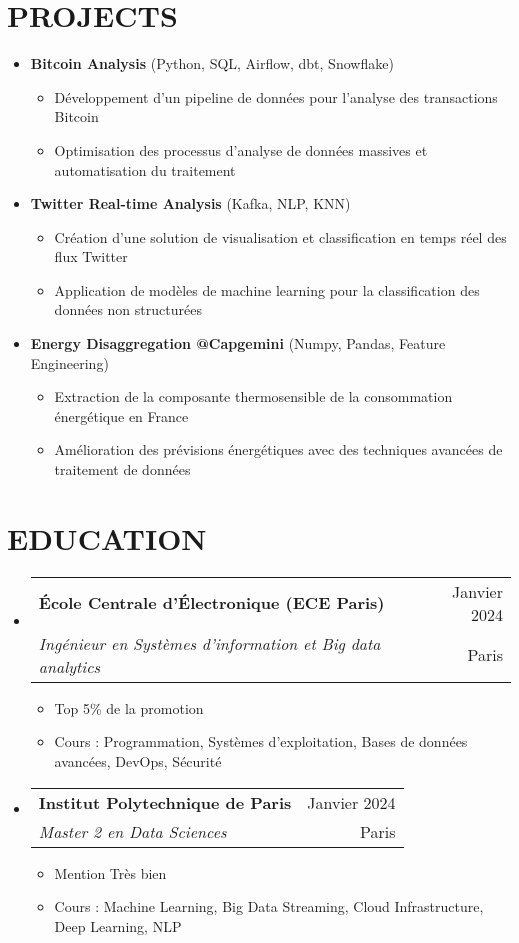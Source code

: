 \documentclass[letterpaper,11pt]{article}
\makeatletter
\newcommand{\resumeItem}[1]{
  \item\small{
    {#1 \vspace{-1pt}}
  }
}
\newcommand{\resumeSubheading}[4]{
  \vspace{-1pt}\item
    \begin{tabular*}{\textwidth}[t]{l@{\extracolsep{\fill}}r}
      \textbf{#1} & {\color{dark-grey}\small #2}\vspace{1pt}\\
      \textit{#3} & {\color{dark-grey} \small #4}\\
    \end{tabular*}\vspace{-4pt}
}
\newcommand{\resumeProjectHeading}[2]{
  \item
  {#1} \hfill {#2}
}
\newcommand{\resumeSubHeadingListStart}{\begin{itemize}[leftmargin=0in, label={}]}
\newcommand{\resumeSubHeadingListEnd}{\end{itemize}}
\newcommand{\resumeItemListStart}{\begin{itemize}[label={\textbullet}]}
\newcommand{\resumeItemListEnd}{\end{itemize}\vspace{0pt}}
\makeatother
\begin{document}
\section{PROJECTS}
\resumeSubHeadingListStart
      \resumeProjectHeading
          {\textbf{Bitcoin Analysis} \small{(Python, SQL, Airflow, dbt, Snowflake)}} {}
          \resumeItemListStart
            \resumeItem{Développement d'un pipeline de données pour l'analyse des transactions Bitcoin}
            \resumeItem{Optimisation des processus d'analyse de données massives et automatisation du traitement}
          \resumeItemListEnd
      \resumeProjectHeading
          {\textbf{Twitter Real-time Analysis} \small{(Kafka, NLP, KNN)}} {}
          \resumeItemListStart
            \resumeItem{Création d'une solution de visualisation et classification en temps réel des flux Twitter}
            \resumeItem{Application de modèles de machine learning pour la classification des données non structurées}
          \resumeItemListEnd
      \resumeProjectHeading
          {\textbf{Energy Disaggregation @Capgemini} \small{(Numpy, Pandas, Feature Engineering)}} {}
          \resumeItemListStart
            \resumeItem{Extraction de la composante thermosensible de la consommation énergétique en France}
            \resumeItem{Amélioration des prévisions énergétiques avec des techniques avancées de traitement de données}
          \resumeItemListEnd
    \resumeSubHeadingListEnd

\section{EDUCATION}
\resumeSubHeadingListStart
    \resumeSubheading
      {École Centrale d'Électronique (ECE Paris)}{Janvier 2024}
      {Ingénieur en Systèmes d'information et Big data analytics}{Paris}
      \resumeItemListStart
        \resumeItem{Top 5\% de la promotion}
        \resumeItem{Cours : Programmation, Syst\`emes d'exploitation, Bases de donn\'ees avanc\'ees, DevOps, S\'ecurit\'e}
      \resumeItemListEnd
    \resumeSubheading
      {Institut Polytechnique de Paris}{Janvier 2024}
      {Master 2 en Data Sciences}{Paris}
      \resumeItemListStart
        \resumeItem{Mention Tr\`es bien}
        \resumeItem{Cours : Machine Learning, Big Data Streaming, Cloud Infrastructure, Deep Learning, NLP}
      \resumeItemListEnd
  \resumeSubHeadingListEnd
\end{document}
